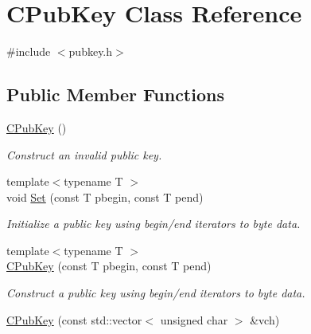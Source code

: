\hypertarget{class_c_pub_key}{}\section{C\+Pub\+Key Class Reference}
\label{class_c_pub_key}


{\ttfamily \#include $<$pubkey.\+h$>$}

\subsection*{Public Member Functions}
\begin{DoxyCompactItemize}
\item 
\mbox{\label{class_c_pub_key_a468f3aef3555d12ede19c0d8dc88c13a}} 
\mbox{\hyperlink{class_c_pub_key_a468f3aef3555d12ede19c0d8dc88c13a}{C\+Pub\+Key}} ()
\begin{DoxyCompactList}\small\item\em Construct an invalid public key. \end{DoxyCompactList}\item 
\mbox{\label{class_c_pub_key_af59bc1d3be119c1f8b49d3c1e2c0797b}} 
{\footnotesize template$<$typename T $>$ }\\void \mbox{\hyperlink{class_c_pub_key_af59bc1d3be119c1f8b49d3c1e2c0797b}{Set}} (const T pbegin, const T pend)
\begin{DoxyCompactList}\small\item\em Initialize a public key using begin/end iterators to byte data. \end{DoxyCompactList}\item 
\mbox{\label{class_c_pub_key_a8c7527b40c96bfb8f48b669764301df8}} 
{\footnotesize template$<$typename T $>$ }\\\mbox{\hyperlink{class_c_pub_key_a8c7527b40c96bfb8f48b669764301df8}{C\+Pub\+Key}} (const T pbegin, const T pend)
\begin{DoxyCompactList}\small\item\em Construct a public key using begin/end iterators to byte data. \end{DoxyCompactList}\item 
\mbox{\label{class_c_pub_key_a31307d0318ebda95c7e34ef1554fe2d2}} 
\mbox{\hyperlink{class_c_pub_key_a31307d0318ebda95c7e34ef1554fe2d2}{C\+Pub\+Key}} (const std\+::vector$<$ unsigned char $>$ \&vch)

\end{DoxyCompactItemize}
